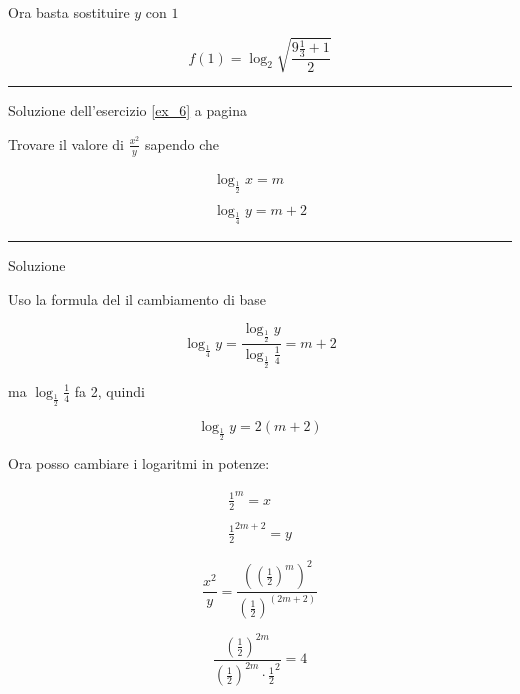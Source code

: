 Ora basta sostituire $y$ con $1$

\begin{equation*}
f(1)=\log_2{\sqrt{\frac{9\frac{1}{3}+1}{2}}}
\end{equation*}



\vspace{1cm}
\hrule
\vspace{1cm}
Soluzione dell'esercizio \ref{ex_6} a pagina \pageref{ex_6}\label{sol_6}

Trovare il valore di $\frac{x^2}{y}$ sapendo che 

\begin{equation*}
\begin{split}
\log_{\frac{1}{2}}x=m \\
\\
\log_{\frac{1}{4}}y=m+2
\end{split}
\end{equation*}

\vspace{1cm}
\hrule
\vspace{1cm}

Soluzione

Uso la formula del il cambiamento di base

\begin{equation*}
\log_{\frac{1}{4}}y=\frac{
\log_{\frac{1}{2}}y
}{
\log_{\frac{1}{2}}\frac{1}{4}
}=m+2
\end{equation*}

ma $\log_{\frac{1}{2}}\frac{1}{4}$ fa 2, quindi

\begin{equation*}
\log_\frac{1}{2}y=2(m+2)
\end{equation*}

Ora posso cambiare i logaritmi in potenze:

\begin{equation*}
\begin{split}
\frac{1}{2}^m=x \\
\\
\frac{1}{2}^{2m+2}=y
\end{split}
\end{equation*}

\begin{equation*}
\frac{x^2}{y}=
\frac{
\left( \left( \frac{1}{2} \right)^m \right)^2
}{
\left( \frac{1}{2} \right) ^{(2m+2)}
}
\end{equation*}

\begin{equation*}
\frac{
\left( \frac{1}{2} \right)^{2m}
}{
\left( \frac{1}{2} \right) ^{2m} \cdot
\frac{1}{2}^2
}=4
\end{equation*}

